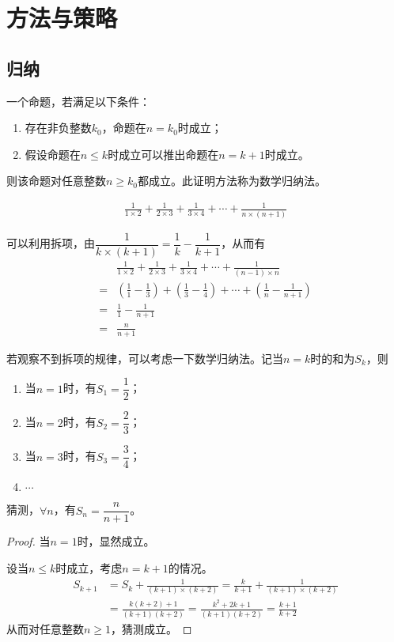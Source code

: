 
\chapter{方法与策略}
\label{chap:methods}

\section{归纳}
\label{sec:induction}

\begin{definition}
  一个命题，若满足以下条件：
  \begin{enumerate}
  \item 存在非负整数$k_0$，命题在$n=k_0$时成立；
  \item 假设命题在$n\le k$时成立可以推出命题在$n=k+1$时成立。
  \end{enumerate}
  则该命题对任意整数$n\ge k_0$都成立。此证明方法称为数学归纳法。
\end{definition}

\begin{example}[求和]
  \begin{align*}
    \frac1{1\times2}+\frac1{2\times3}+\frac1{3\times4}+\cdots+\frac1{n\times (n+1)}
  \end{align*}
\end{example}

可以利用拆项，由$\dfrac1{k\times (k+1)}=\dfrac1k-\dfrac1{k+1}$，从而有
\begin{align*}
  &\frac1{1\times2}+\frac1{2\times3}+\frac1{3\times4}+\cdots+\frac1{(n-1)\times n}\\
  =&\left(\frac11-\frac13\right) + \left(\frac13-\frac14\right) + \cdots + \left(\frac1n-\frac1{n+1}\right)\\
  =&\frac11-\frac1{n+1}\\
  =&\frac{n}{n+1}
\end{align*}

若观察不到拆项的规律，可以考虑一下数学归纳法。记当$n=k$时的和为$S_k$，则
\begin{enumerate}
\item 当$n=1$时，有$S_1=\dfrac12$；
\item 当$n=2$时，有$S_2=\dfrac23$；
\item 当$n=3$时，有$S_3=\dfrac34$；
\item $\cdots$
\end{enumerate}
猜测，$\forall n$，有$S_n=\dfrac{n}{n+1}$。
\begin{proof}
  当$n=1$时，显然成立。

  设当$n\le k$时成立，考虑$n=k+1$的情况。
  \begin{align*}
    S_{k+1}&=S_k + \frac1{(k+1)\times(k+2)}
             =\frac{k}{k+1}+\frac1{(k+1)\times(k+2)}\\
           &=\frac{k(k+2)+1}{(k+1)(k+2)}
           =\frac{k^2+2k+1}{(k+1)(k+2)}
           =\frac{k+1}{k+2}
  \end{align*}
  从而对任意整数$n\ge1$，猜测成立。
\end{proof}



